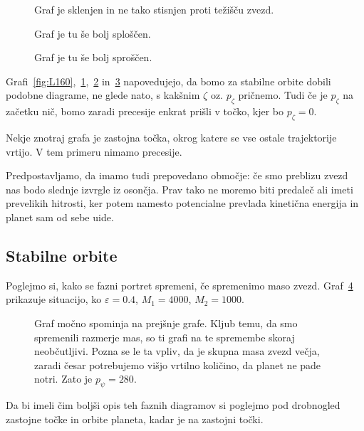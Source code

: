 \documentclass[12pt, a4paper]{article}
\begin{document}
\begin{figure}[H]\centering
	
	\caption{Graf je sklenjen in ne tako stisnjen proti te\v zi\v s\v cu zvezd.}
	\label{fig:L180}
\end{figure}

\begin{figure}[H]\centering
	
	\caption{Graf je tu \v se bolj splo\v s\v cen.}
	\label{fig:L200}
\end{figure}

\begin{figure}[H]\centering
	
	\caption{Graf je tu \v se bolj spro\v s\v cen.}
	\label{fig:L220}
\end{figure}

Grafi~\ref{fig:L160},~\ref{fig:L180},~\ref{fig:L200} in~\ref{fig:L220} napovedujejo, da bomo za stabilne orbite
dobili podobne diagrame, ne glede nato, s kak\v snim $\zeta$ oz. $p_\zeta$ pri\v cnemo. Tudi \v ce je $p_\zeta$
na za\v cetku ni\v c, bomo zaradi precesije enkrat pri\v sli v to\v cko, kjer bo $p_\zeta = 0$.

Nekje znotraj grafa je zastojna to\v cka, okrog katere se vse ostale trajektorije vrtijo. V tem primeru nimamo
precesije.

Predpostavljamo, da imamo tudi prepovedano obmo\v cje: \v ce smo preblizu zvezd nas bodo slednje izvrgle iz
oson\v cja. Prav tako ne moremo biti predale\v c ali imeti prevelikih hitrosti, ker potem namesto potencialne
prevlada kineti\v cna energija in planet sam od sebe uide.

\subsection{Stabilne orbite}

Poglejmo si, kako se fazni portret spremeni, \v ce spremenimo maso zvezd. Graf~\ref{fig:M4000} prikazuje
situacijo, ko $\varepsilon = 0.4$, $M_1 = 4000$, $M_2 = 1000$.
\begin{figure}[H]\centering
	
	\caption{Graf mo\v cno spominja na prej\v snje grafe. Kljub temu, da smo spremenili razmerje mas, so
		ti grafi na te spremembe skoraj neob\v cutljivi. Pozna se le ta vpliv, da je skupna masa zvezd ve\v cja,
		zaradi \v cesar potrebujemo vi\v sjo vrtilno koli\v cino, da planet ne pade notri. Zato je $p_\psi = 280$.}
	\label{fig:M4000}
\end{figure}
Da bi imeli \v cim bolj\v si opis teh faznih diagramov si poglejmo pod drobnogled zastojne to\v cke in orbite
planeta, kadar je na zastojni to\v cki.
\end{document}
